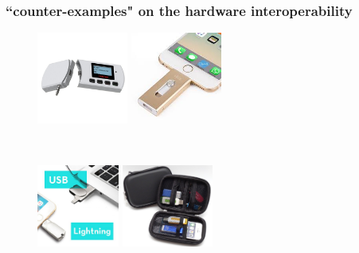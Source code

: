 \documentclass{beamer}
\begin{document}
\frame
{
\frametitle{``counter-examples" on the hardware interoperability}

\begin{figure}
\centering
\begin{minipage}[b]{0.3\textwidth}
\centering
\includegraphics[width=3cm]{./pics/mickey.jpg}
\end{minipage}%
\hspace{0.04\textwidth}%
\begin{minipage}[b]{0.3\textwidth}
\centering
\includegraphics[width=3cm]{./pics/iphonekey.jpeg}
\end{minipage}\\[20pt]
\begin{minipage}[b]{0.3\textwidth}
\centering
\includegraphics[width=2.7cm]{./pics/usb-lightning.jpg}
\end{minipage}
\begin{minipage}[b]{0.3\textwidth}
\centering
\includegraphics[width=3cm]{./pics/keyproblem.png}
\end{minipage}
\end{figure}
}
\end{document}
